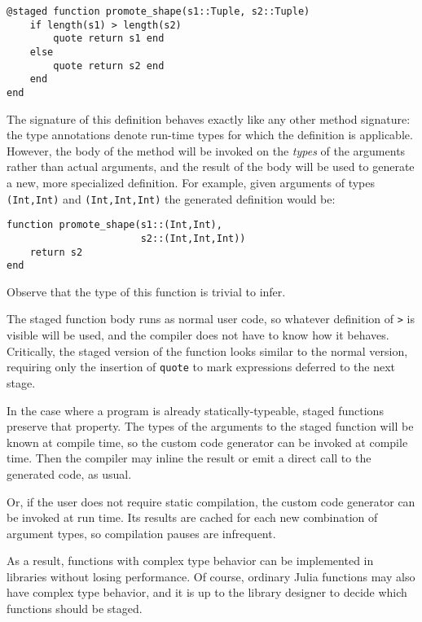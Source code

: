 \documentclass[9pt]{sigplanconf}
\begin{document}
\begin{verbatim}
@staged function promote_shape(s1::Tuple, s2::Tuple)
    if length(s1) > length(s2)
        quote return s1 end
    else
        quote return s2 end
    end
end
\end{verbatim}

The signature of this definition behaves exactly like any other method
signature: the type annotations denote run-time types for which the
definition is applicable. However, the body of the method will be invoked
on the \emph{types} of the arguments rather than actual arguments, and the
result of the body will be used to generate a new, more specialized
definition. For example, given arguments of types
{\tt (Int,Int)} and {\tt (Int,Int,Int)} the generated definition would be:

\begin{verbatim}
function promote_shape(s1::(Int,Int),
                       s2::(Int,Int,Int))
    return s2
end
\end{verbatim}

Observe that the type of this function is trivial to infer.

The staged function body runs as normal user code, so whatever definition
of {\tt >} is visible will be used, and the compiler does not have to know
how it behaves. Critically, the staged version of the function looks
similar to the normal version, requiring only the insertion of {\tt quote}
to mark expressions deferred to the next stage.

In the case where a program is already statically-typeable, staged
functions preserve that property. The types of the arguments to the
staged function will be known at compile time, so the custom code
generator can be invoked at compile time. Then the compiler may inline
the result or emit a direct call to the generated code, as usual.

Or, if the user does not require static compilation, the custom code
generator can be invoked at run time. Its results are cached for each new
combination of argument types, so compilation pauses are infrequent.

As a result, functions with complex type behavior can be implemented
in libraries without losing performance. Of course, ordinary Julia
functions may also have complex type behavior, and it is up to the
library designer to decide which functions should be staged.
\end{document}
